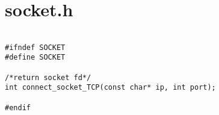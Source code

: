\section{socket.h}
\label{SOCKETH}

\begin{lstlisting}

#ifndef SOCKET
#define SOCKET

/*return socket fd*/
int connect_socket_TCP(const char* ip, int port);

#endif

\end{lstlisting}
